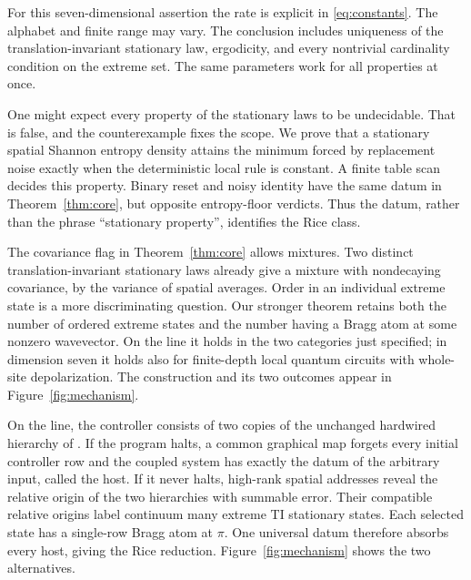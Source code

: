 For this seven-dimensional assertion the rate is explicit in \eqref{eq:constants}. The alphabet and finite range may vary. The conclusion includes uniqueness of the translation-invariant stationary law, ergodicity, and every nontrivial cardinality condition on the extreme set. The same parameters work for all properties at once.

One might expect every property of the stationary laws to be undecidable. That is false, and the counterexample fixes the scope. We prove that a stationary spatial Shannon entropy density attains the minimum forced by replacement noise exactly when the deterministic local rule is constant. A finite table scan decides this property. Binary reset and noisy identity have the same datum in Theorem~\ref{thm:core}, but opposite entropy-floor verdicts. Thus the datum, rather than the phrase ``stationary property'', identifies the Rice class.

The covariance flag in Theorem~\ref{thm:core} allows mixtures. Two distinct translation-invariant stationary laws already give a mixture with nondecaying covariance, by the variance of spatial averages. Order in an individual extreme state is a more discriminating question. Our stronger theorem retains both the number of ordered extreme states and the number having a Bragg atom at some nonzero wavevector. On the line it holds in the two categories just specified; in dimension seven it holds also for finite-depth local quantum circuits with whole-site depolarization. The construction and its two outcomes appear in Figure~\ref{fig:mechanism}.

On the line, the controller consists of two copies of the unchanged
hardwired hierarchy of \cite[Theorem~C]{DMline}. If the program halts,
a common graphical map forgets every initial controller row and the coupled
system has exactly the datum of the arbitrary input, called the host.
If it never halts, high-rank spatial addresses reveal the relative origin
of the two hierarchies with summable error. Their compatible relative
origins label continuum many extreme TI stationary states. Each selected
state has a single-row Bragg atom at $\pi$. One universal datum therefore
absorbs every host, giving the Rice reduction. Figure~\ref{fig:mechanism}
shows the two alternatives.

